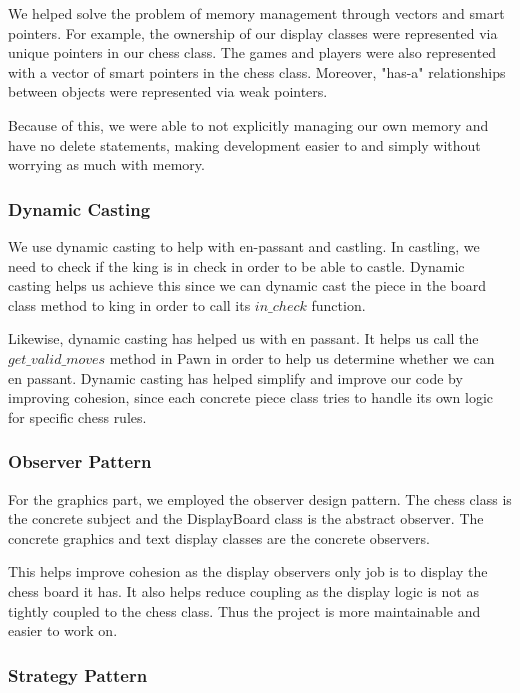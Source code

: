 \documentclass[12pt]{article}
\begin{document}
We helped solve the problem of memory management
through vectors and smart pointers. For example,
the ownership of our display classes 
were represented via unique pointers in our
chess class. The games and players
were also represented with a vector 
of smart pointers in the chess class.
Moreover, "has-a" relationships between objects
were represented via weak pointers.

\bigskip

Because of this, we were able to not 
explicitly managing our own memory and have
no delete statements, making development easier
to and simply without worrying as much with memory.

\subsubsection*{Dynamic Casting}

We use dynamic casting to help with en-passant
and castling. In castling, we need to check
if the king is in check in order to be
able to castle. Dynamic casting helps
us achieve this since we can dynamic
cast the piece in the board class method
to king in order to call its $in\_check$ function.

\bigskip

Likewise, dynamic casting has helped us
with en passant. It helps us call 
the $get\_valid\_moves$ method in Pawn
in order to help us determine
whether we can en passant. Dynamic
casting has helped simplify and improve 
our code by improving cohesion, since each
concrete piece class tries to handle
its own logic for specific chess rules.

\subsubsection*{Observer Pattern}

For the graphics part, we employed the observer
design pattern. The chess class is the concrete subject
and the DisplayBoard class is the abstract observer.
The concrete graphics and text display classes
are the concrete observers. 

\bigskip

This helps
improve cohesion as
the display observers only job is to display
the chess board it has. It also helps
reduce coupling as the display logic 
is not as tightly coupled to the chess class. Thus
the project is more maintainable and easier to work on.

\subsubsection*{Strategy Pattern}
\end{document}
